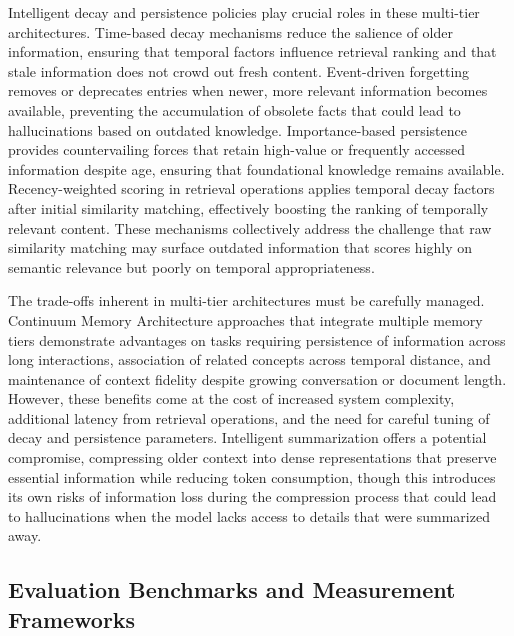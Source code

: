 Intelligent decay and persistence policies play crucial roles in these multi-tier architectures. Time-based decay mechanisms reduce the salience of older information, ensuring that temporal factors influence retrieval ranking and that stale information does not crowd out fresh content. Event-driven forgetting removes or deprecates entries when newer, more relevant information becomes available, preventing the accumulation of obsolete facts that could lead to hallucinations based on outdated knowledge. Importance-based persistence provides countervailing forces that retain high-value or frequently accessed information despite age, ensuring that foundational knowledge remains available. Recency-weighted scoring in retrieval operations applies temporal decay factors after initial similarity matching, effectively boosting the ranking of temporally relevant content. These mechanisms collectively address the challenge that raw similarity matching may surface outdated information that scores highly on semantic relevance but poorly on temporal appropriateness.

The trade-offs inherent in multi-tier architectures must be carefully managed. Continuum Memory Architecture approaches that integrate multiple memory tiers demonstrate advantages on tasks requiring persistence of information across long interactions, association of related concepts across temporal distance, and maintenance of context fidelity despite growing conversation or document length. However, these benefits come at the cost of increased system complexity, additional latency from retrieval operations, and the need for careful tuning of decay and persistence parameters. Intelligent summarization offers a potential compromise, compressing older context into dense representations that preserve essential information while reducing token consumption, though this introduces its own risks of information loss during the compression process that could lead to hallucinations when the model lacks access to details that were summarized away.

\subsection{Evaluation Benchmarks and Measurement Frameworks}

